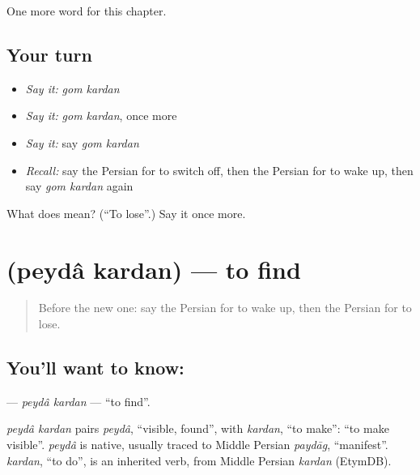 \begin{grammarlens}[title={What you've built}]
One more word for this chapter.
\end{grammarlens}

\subsection*{Your turn}
\begin{itemize}
\raggedright
  \item \emph{Say it:} \emph{gom kardan}
  \item \emph{Say it:} \emph{gom kardan}, once more
  \item \emph{Say it:} say \emph{gom kardan}
  \item \emph{Recall:} say the Persian for to switch off, then the Persian for to wake up, then say \emph{gom kardan} again
\end{itemize}

\begin{tcolorbox}[breakable,colback=teal!4,colframe=teal!35!black,title={Before you move on}]
What does   mean? (\textquotedblleft{}To lose\textquotedblright{}.) Say it once more.
\end{tcolorbox}
\section[\texorpdfstring{\fa{پیدا} \fa{کردن} (peydâ kardan)}{پیدا کردن (peydâ kardan)}]{  (peydâ kardan) — to find}

\label{lesson:FA-C141-peyda-kardan}



\begin{quote}
Before the new one: say the Persian for to wake up, then the Persian for to lose.
\end{quote}

\subsection*{You'll want to know:  }
\textbf{ } — \emph{peydâ kardan} — \textquotedblleft{}to find\textquotedblright{}.

\begin{cousinweb}
\emph{peydâ kardan} pairs \emph{peydâ}, \textquotedblleft{}visible, found\textquotedblright{}, with \emph{kardan}, \textquotedblleft{}to make\textquotedblright{}: \textquotedblleft{}to make visible\textquotedblright{}. \emph{peydâ} is native, usually traced to Middle Persian \emph{paydāg}, \textquotedblleft{}manifest\textquotedblright{}. \emph{kardan}, \textquotedblleft{}to do\textquotedblright{}, is an inherited verb, from Middle Persian \emph{kardan} (EtymDB).
\end{cousinweb}

